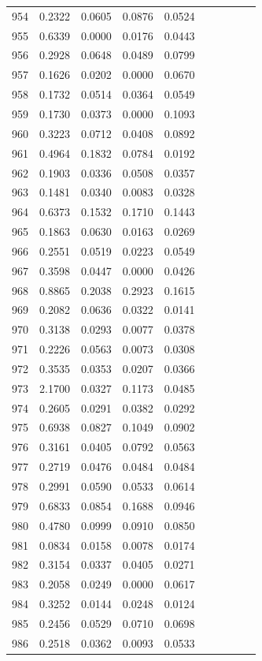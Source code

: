 \begin{table}
\begin{tabular}{cccccccccc}
954& 0.2322& 0.0605& 0.0876& 0.0524\\ 
955& 0.6339& 0.0000& 0.0176& 0.0443\\ 
956& 0.2928& 0.0648& 0.0489& 0.0799\\ 
957& 0.1626& 0.0202& 0.0000& 0.0670\\ 
958& 0.1732& 0.0514& 0.0364& 0.0549\\ 
959& 0.1730& 0.0373& 0.0000& 0.1093\\ 
960& 0.3223& 0.0712& 0.0408& 0.0892\\ 
961& 0.4964& 0.1832& 0.0784& 0.0192\\ 
962& 0.1903& 0.0336& 0.0508& 0.0357\\ 
963& 0.1481& 0.0340& 0.0083& 0.0328\\ 
964& 0.6373& 0.1532& 0.1710& 0.1443\\ 
965& 0.1863& 0.0630& 0.0163& 0.0269\\ 
966& 0.2551& 0.0519& 0.0223& 0.0549\\ 
967& 0.3598& 0.0447& 0.0000& 0.0426\\ 
968& 0.8865& 0.2038& 0.2923& 0.1615\\ 
969& 0.2082& 0.0636& 0.0322& 0.0141\\ 
970& 0.3138& 0.0293& 0.0077& 0.0378\\ 
971& 0.2226& 0.0563& 0.0073& 0.0308\\ 
972& 0.3535& 0.0353& 0.0207& 0.0366\\ 
973& 2.1700& 0.0327& 0.1173& 0.0485\\ 
974& 0.2605& 0.0291& 0.0382& 0.0292\\ 
975& 0.6938& 0.0827& 0.1049& 0.0902\\ 
976& 0.3161& 0.0405& 0.0792& 0.0563\\ 
977& 0.2719& 0.0476& 0.0484& 0.0484\\ 
978& 0.2991& 0.0590& 0.0533& 0.0614\\ 
979& 0.6833& 0.0854& 0.1688& 0.0946\\ 
980& 0.4780& 0.0999& 0.0910& 0.0850\\ 
981& 0.0834& 0.0158& 0.0078& 0.0174\\ 
982& 0.3154& 0.0337& 0.0405& 0.0271\\ 
983& 0.2058& 0.0249& 0.0000& 0.0617\\ 
984& 0.3252& 0.0144& 0.0248& 0.0124\\ 
985& 0.2456& 0.0529& 0.0710& 0.0698\\ 
986& 0.2518& 0.0362& 0.0093& 0.0533\\ 

\end{tabular}
\end{table}
